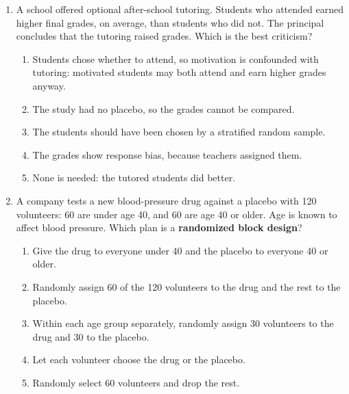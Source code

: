 \documentclass[12pt]{article}
\begin{document}
\begin{enumerate}[leftmargin=1.9em, itemsep=0.13in]
  \boxguard[13]
  \item A school offered optional after-school tutoring. Students who attended earned higher
        final grades, on average, than students who did not. The principal concludes that the
        tutoring raised grades. Which is the best criticism?
        \begin{enumerate}[label=\textbf{(\Alph*)}, leftmargin=2.2em, itemsep=2pt]
          \item Students chose whether to attend, so motivation is confounded with tutoring:
                motivated students may both attend and earn higher grades anyway.
          \item The study had no placebo, so the grades cannot be compared.
          \item The students should have been chosen by a stratified random sample.
          \item The grades show response bias, because teachers assigned them.
          \item None is needed: the tutored students did better.\hfill{}\rule[-0.2in]{0pt}{0.48in}
        \end{enumerate}

  \boxguard[13]
  \item A company tests a new blood-pressure drug against a placebo with 120 volunteers: 60 are
        under age 40, and 60 are age 40 or older. Age is known to affect blood pressure. Which
        plan is a \textbf{randomized block design}?
        \begin{enumerate}[label=\textbf{(\Alph*)}, leftmargin=2.2em, itemsep=2pt]
          \item Give the drug to everyone under 40 and the placebo to everyone 40 or older.
          \item Randomly assign 60 of the 120 volunteers to the drug and the rest to the placebo.
          \item Within each age group separately, randomly assign 30 volunteers to the drug and
                30 to the placebo.
          \item Let each volunteer choose the drug or the placebo.
          \item Randomly select 60 volunteers and drop the rest.\hfill{}\rule[-0.2in]{0pt}{0.48in}
        \end{enumerate}


\end{enumerate}
\end{document}
